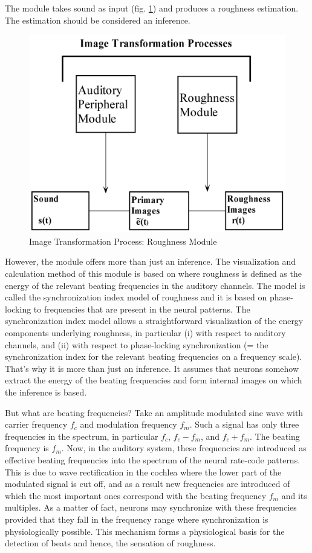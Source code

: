 The module takes sound as input (fig. \ref{Fig:RMModule}) and
produces a roughness estimation. The estimation should be
considered an inference.
\begin{figure}[h]
    \centering
    \includegraphics[width=\IPEMDefaultFigureWidth]{Graphics/RMModule}
    \caption{Image Transformation Process: Roughness Module}
    \label{Fig:RMModule}
\end{figure}
However, the module offers more than just an inference. The
visualization and calculation method of this module is based on
 where roughness is
defined as the energy of the relevant beating frequencies in the
auditory channels. The model is called the synchronization index
model of roughness and it is based on phase-locking to frequencies
that are present in the neural patterns. The synchronization index
model allows a straightforward visualization of the energy
components underlying roughness, in particular (i) with respect to
auditory channels, and (ii) with respect to phase-locking
synchronization (= the synchronization index for the relevant
beating frequencies on a frequency scale). That's why it is more
than just an inference. It assumes that neurons somehow extract
the energy of the beating frequencies and form internal images on
which the inference is based.

But what are beating frequencies? Take an amplitude modulated sine
wave with carrier frequency $f_c$ and modulation frequency $f_m$.
Such a signal has only three frequencies in the spectrum, in
particular $f_c$, $f_c-f_m$, and $f_c+f_m$. The beating frequency
is $f_m$. Now, in the auditory system, these frequencies are
introduced as effective beating frequencies into the spectrum of
the neural rate-code patterns. This is due to wave rectification
in the cochlea where the lower part of the modulated signal is cut
off, and as a result new frequencies are introduced of which the
most important ones correspond with the beating frequency $f_m$
and its multiples. As a matter of fact, neurons may synchronize
with these frequencies provided that they fall in the frequency
range where synchronization is physiologically possible. This
mechanism forms a physiological basis for the detection of beats
and hence, the sensation of roughness.

